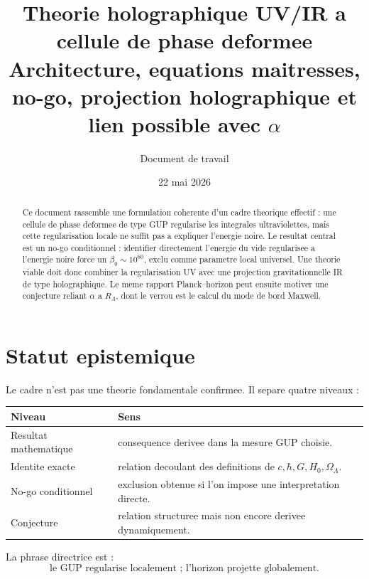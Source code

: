 \documentclass[11pt,a4paper]{article}
\title{\textbf{Theorie holographique UV/IR a cellule de phase deformee}\\
\large Architecture, equations maitresses, no-go, projection holographique et lien possible avec $\alpha$}
\author{Document de travail}
\date{22 mai 2026}
\begin{document}
\maketitle

\begin{abstract}
Ce document rassemble une formulation coherente d'un cadre theorique effectif :
une cellule de phase deformee de type GUP regularise les integrales
ultraviolettes, mais cette regularisation locale ne suffit pas a expliquer
l'energie noire. Le resultat central est un no-go conditionnel : identifier
directement l'energie du vide regularisee a l'energie noire force un
\(\beta_0\sim10^{60}\), exclu comme parametre local universel. Une theorie
viable doit donc combiner la regularisation UV avec une projection
gravitationnelle IR de type holographique. Le meme rapport Planck--horizon
peut ensuite motiver une conjecture reliant \(\alpha\) a \(R_\Lambda\), dont le
verrou est le calcul du mode de bord Maxwell.
\end{abstract}

\tableofcontents
\newpage

\section{Statut epistemique}

Le cadre n'est pas une theorie fondamentale confirmee. Il separe quatre
niveaux :

\begin{center}
\begin{tabular}{@{}p{4cm}p{10cm}@{}}
\toprule
Niveau & Sens \\
\midrule
Resultat mathematique & consequence derivee dans la mesure GUP choisie. \\
Identite exacte & relation decoulant des definitions de \(c,\hbar,G,H_0,\Omega_\Lambda\). \\
No-go conditionnel & exclusion obtenue si l'on impose une interpretation directe. \\
Conjecture & relation structuree mais non encore derivee dynamiquement. \\
\bottomrule
\end{tabular}
\end{center}

La phrase directrice est :
\begin{equation}
\boxed{\text{le GUP regularise localement ; l'horizon projette globalement.}}
\end{equation}
\end{document}
